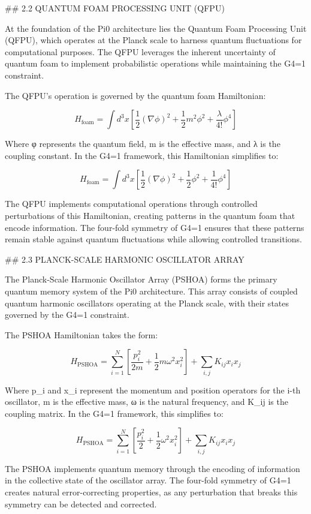 ## 2.2 QUANTUM FOAM PROCESSING UNIT (QFPU)

At the foundation of the Pi0 architecture lies the Quantum Foam Processing Unit (QFPU), which operates at the Planck scale to harness quantum fluctuations for computational purposes. The QFPU leverages the inherent uncertainty of quantum foam to implement probabilistic operations while maintaining the G4=1 constraint.

The QFPU's operation is governed by the quantum foam Hamiltonian:

$$H_{\text{foam}} = \int d^3x \left[ \frac{1}{2}(\nabla\phi)^2 + \frac{1}{2}m^2\phi^2 + \frac{\lambda}{4!}\phi^4 \right]$$

Where φ represents the quantum field, m is the effective mass, and λ is the coupling constant. In the G4=1 framework, this Hamiltonian simplifies to:

$$H_{\text{foam}} = \int d^3x \left[ \frac{1}{2}(\nabla\phi)^2 + \frac{1}{2}\phi^2 + \frac{1}{4!}\phi^4 \right]$$

The QFPU implements computational operations through controlled perturbations of this Hamiltonian, creating patterns in the quantum foam that encode information. The four-fold symmetry of G4=1 ensures that these patterns remain stable against quantum fluctuations while allowing controlled transitions.

## 2.3 PLANCK-SCALE HARMONIC OSCILLATOR ARRAY

The Planck-Scale Harmonic Oscillator Array (PSHOA) forms the primary quantum memory system of the Pi0 architecture. This array consists of coupled quantum harmonic oscillators operating at the Planck scale, with their states governed by the G4=1 constraint.

The PSHOA Hamiltonian takes the form:

$$H_{\text{PSHOA}} = \sum_{i=1}^N \left[ \frac{p_i^2}{2m} + \frac{1}{2}m\omega^2 x_i^2 \right] + \sum_{i,j} K_{ij}x_i x_j$$

Where p_i and x_i represent the momentum and position operators for the i-th oscillator, m is the effective mass, ω is the natural frequency, and K_ij is the coupling matrix. In the G4=1 framework, this simplifies to:

$$H_{\text{PSHOA}} = \sum_{i=1}^N \left[ \frac{p_i^2}{2} + \frac{1}{2}\omega^2 x_i^2 \right] + \sum_{i,j} K_{ij}x_i x_j$$

The PSHOA implements quantum memory through the encoding of information in the collective state of the oscillator array. The four-fold symmetry of G4=1 creates natural error-correcting properties, as any perturbation that breaks this symmetry can be detected and corrected.

